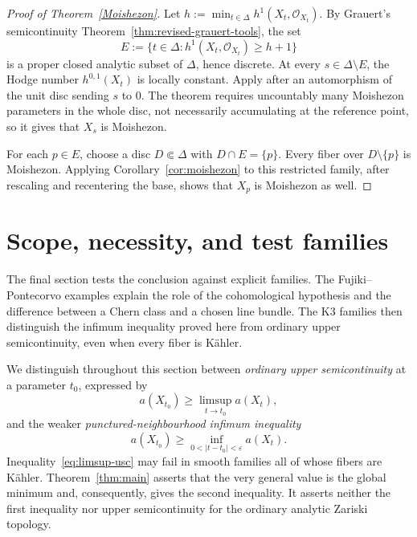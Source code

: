 \documentclass[11pt]{amsart}
\numberwithin{equation}{section}
\theoremstyle{plain}
\theoremstyle{definition}
\newcommand{\cO}{\mathcal O}
\begin{document}
\begin{proof}[Proof of Theorem~\ref{Moishezon}]
Let $h:=\min_{t\in\Delta}h^1(X_t,\cO_{X_t})$.  By Grauert's
semicontinuity Theorem~\ref{thm:revised-grauert-tools}, the set
\[
 E:=\{t\in\Delta:h^1(X_t,\cO_{X_t})\ge h+1\}
\]
is a proper closed analytic subset of $\Delta$, hence discrete.
At every $s\in\Delta\setminus E$, the Hodge number $h^{0,1}(X_t)$ is
locally constant.  Apply \cite[Theorem~1.4]{RT21} after an automorphism
of the unit disc sending $s$ to $0$.  The theorem requires uncountably
many Moishezon parameters in the whole disc, not necessarily accumulating
at the reference point, so it gives that $X_s$ is Moishezon.

For each $p\in E$, choose a disc $D\Subset\Delta$ with $D\cap E=\{p\}$.
Every fiber over $D\setminus\{p\}$ is Moishezon.  Applying
Corollary~\ref{cor:moishezon} to this restricted family, after rescaling
and recentering the base, shows that $X_p$ is Moishezon as well.
\end{proof}

\section{Scope, necessity, and test families}
\label{s:scope-examples}

The final section tests the conclusion against explicit families.
The Fujiki--Pontecorvo examples explain the role of the cohomological
hypothesis and the difference between a Chern class and a chosen line
bundle.  The K3 families then distinguish the infimum inequality proved
here from ordinary upper semicontinuity, even when every fiber is
K\"ahler.

We distinguish throughout this section between \emph{ordinary upper
semicontinuity} at a parameter $t_0$, expressed by
\begin{equation}\label{eq:limsup-usc}
 a(X_{t_0})\geq\limsup_{t\to t_0}a(X_t),
\end{equation}
and the weaker \emph{punctured-neighbourhood infimum inequality}
\begin{equation}\label{eq:infimum-usc}
 a(X_{t_0})\geq
 \inf_{0<|t-t_0|<\varepsilon}a(X_t).
\end{equation}
Inequality~\eqref{eq:limsup-usc} may fail in smooth families all of whose fibers are
K\"ahler.  Theorem~\ref{thm:main} asserts that the very general value is
the global minimum and, consequently, gives the second inequality.
It asserts neither the first inequality nor upper semicontinuity for
the ordinary analytic Zariski topology.
\end{document}
